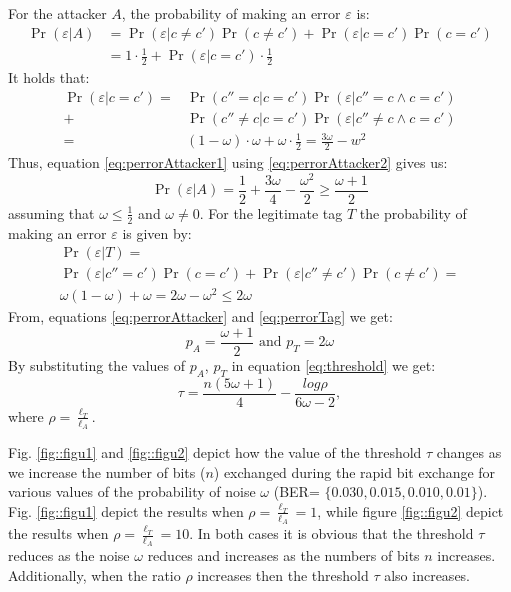 \documentclass{article}
\newcommand \thr {\tau}
\newcommand \err {\varepsilon}
\newcommand \noise {\omega}
\newcommand \pa {p_A}
\newcommand \pt {p_T}
\newcommand \LA {\ell_A}
\newcommand \LT {\ell_T}
\newcommand \AND {\wedge}
\begin{document}
For the attacker $A$, the probability of making an error $\err$ is:
\begin{align}
 \Pr(\err | A) &=
 \Pr (\err | c \neq c') \Pr(c \neq c') +   \Pr (\err | c = c') \Pr(c = c')   \nonumber \\
&= 1\cdot \frac{1}{2} +  \Pr (\err | c = c')\cdot \frac {1}{2}\label{eq:perrorAttacker1}
\end{align}
It holds that:
\begin{align}
  \Pr(\err | c=c')
  =& \Pr(c''=c | c=c' )  \Pr(\err | c'' = c \AND  c=c')   \nonumber\\
  + & \Pr(c'' \neq c | c=c' )  \Pr(\err | c'' \neq c \AND  c=c')  \nonumber \\
  =&(1 - \noise) \cdot \noise + \noise \cdot \frac {1} {2} = \frac {3
    \noise} {2} - w^{2}
 \label{eq:perrorAttacker2}
\end{align}
Thus, equation \eqref{eq:perrorAttacker1} using
\eqref{eq:perrorAttacker2} gives us:
\begin{equation}
 \Pr(\err | A) = \frac{1}{2} +  \frac {3 \noise} {4} - \frac {\noise^{2}} {2}  \geq \frac {\noise +1} {2}
 \label{eq:perrorAttacker}
\end{equation}
assuming that $\noise \leq \frac {1} {2}$ and $\noise \neq 0$.
For the legitimate tag $T$ the probability of making an error $\err$
is given by:
\begin{align}
 \Pr (\err | T) = \nonumber \\
\Pr (\err | c'' =c') \Pr(c=c') + \Pr (\err | c'' \neq c') \Pr(c\neq c') = \nonumber \\
\noise  (1 - \noise) + \noise = 2 \noise - \noise ^{2} \leq 2 \noise
\label{eq:perrorTag}
\end{align}
From, equations \eqref{eq:perrorAttacker} and \eqref{eq:perrorTag} we get:
\begin{equation}
\pa=\frac {\omega + 1} {2}  \mbox{ and } \pt=2\noise
\end{equation}
By substituting the values of $\pa$, $\pt$ in  equation \eqref{eq:threshold} we get:
\begin{equation}
\thr = \frac {n (5 \noise +1)}{4} - \frac {log\rho}{6\noise -2},
\end{equation}
where $\rho=\frac {\LT} {\LA}$.

Fig. \ref{fig::figu1} and \ref{fig::figu2} depict how the value of the threshold $\thr$ changes as we increase the number of bits ($n$) exchanged during the rapid bit exchange for various values of the probability of noise $\noise$ (BER= $\{0.030, 0.015,0.010,0.01\}$). Fig. \ref{fig::figu1} depict the results when $\rho=\frac {\LT} {\LA}=1$, while figure \ref{fig::figu2} depict the results when $\rho=\frac {\LT} {\LA}=10$. In both cases it is obvious that the threshold $\thr$ reduces as the noise $\noise$ reduces and increases as the numbers of bits $n$ increases. Additionally, when the ratio $\rho$ increases then the threshold $\thr$ also increases.
\end{document}
